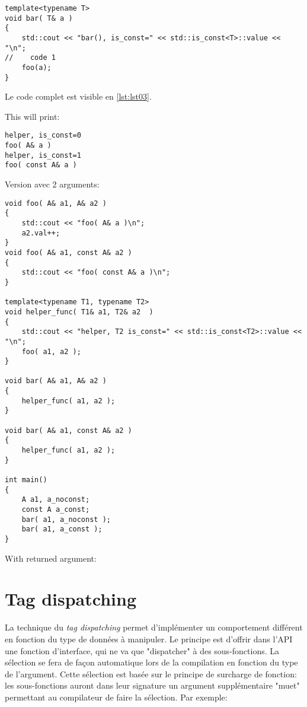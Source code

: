 \documentclass[11pt,a4paper]{article}
\begin{document}

\begin{lstlisting}
template<typename T>
void bar( T& a )
{
    std::cout << "bar(), is_const=" << std::is_const<T>::value << "\n";
//    code 1    
	foo(a);
}
\end{lstlisting}

Le code complet est visible en \ref{lst:lst03}.




This will print:
\begin{lstlisting}
helper, is_const=0
foo( A& a )
helper, is_const=1
foo( const A& a )
\end{lstlisting}

Version avec 2 arguments:

\begin{lstlisting}
void foo( A& a1, A& a2 )
{
    std::cout << "foo( A& a )\n";
    a2.val++;
}
void foo( A& a1, const A& a2 )
{
    std::cout << "foo( const A& a )\n";
}

template<typename T1, typename T2>
void helper_func( T1& a1, T2& a2  )
{
    std::cout << "helper, T2 is_const=" << std::is_const<T2>::value << "\n";
	foo( a1, a2 );
}

void bar( A& a1, A& a2 )
{
	helper_func( a1, a2 );
}

void bar( A& a1, const A& a2 )
{
	helper_func( a1, a2 );
}
 
int main()
{
    A a1, a_noconst;
    const A a_const;
    bar( a1, a_noconst );
    bar( a1, a_const );
}
\end{lstlisting}

With returned argument:


\section{Tag dispatching}

La technique du {\em tag dispatching}
permet d'implémenter un comportement différent en fonction du type de données à manipuler.
Le principe est d'offrir dans l'API une fonction d'interface, qui ne va que "dispatcher" à des sous-fonctions.
La sélection se fera de façon automatique lors de la compilation en fonction du type de l'argument.
Cette sélection est basée sur le principe de surcharge de fonction:
les sous-fonctions auront dans leur signature un argument supplémentaire "muet" permettant au compilateur de faire la sélection.
Par exemple:
\end{document}
